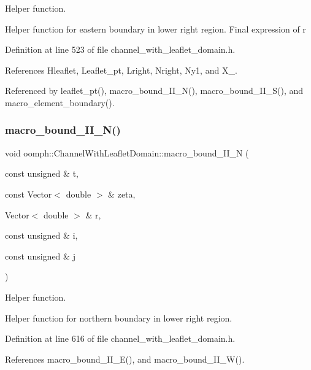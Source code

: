 Helper function. 

Helper function for eastern boundary in lower right region. Final expression of r 

Definition at line 523 of file channel\+\_\+with\+\_\+leaflet\+\_\+domain.\+h.



References Hleaflet, Leaflet\+\_\+pt, Lright, Nright, Ny1, and X\+\_.



Referenced by leaflet\+\_\+pt(), macro\+\_\+bound\+\_\+\+I\+I\+\_\+\+N(), macro\+\_\+bound\+\_\+\+I\+I\+\_\+\+S(), and macro\+\_\+element\+\_\+boundary().

\mbox{\label{classoomph_1_1ChannelWithLeafletDomain_a1402c0d3fe42a8ffd6c9fb1d6df9d460}} 
\subsubsection{\texorpdfstring{macro\+\_\+bound\+\_\+\+I\+I\+\_\+\+N()}{macro\_bound\_II\_N()}}
{\footnotesize\ttfamily void oomph\+::\+Channel\+With\+Leaflet\+Domain\+::macro\+\_\+bound\+\_\+\+I\+I\+\_\+N (\begin{DoxyParamCaption}\item[{const unsigned \&}]{t,  }\item[{const Vector$<$ double $>$ \&}]{zeta,  }\item[{Vector$<$ double $>$ \&}]{r,  }\item[{const unsigned \&}]{i,  }\item[{const unsigned \&}]{j }\end{DoxyParamCaption})\hspace{0.3cm}{\ttfamily [protected]}}



Helper function. 

Helper function for northern boundary in lower right region. 

Definition at line 616 of file channel\+\_\+with\+\_\+leaflet\+\_\+domain.\+h.



References macro\+\_\+bound\+\_\+\+I\+I\+\_\+\+E(), and macro\+\_\+bound\+\_\+\+I\+I\+\_\+\+W().



